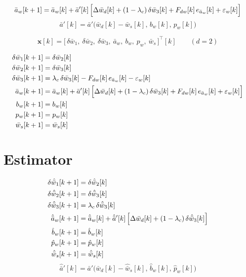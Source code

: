 \documentclass[11pt,a4paper,fontset=none]{ctexart}
\begin{document}
\begin{align*}
\bar{a}_w[k+1] = \bar{a}_w[k] + \bar{a}'[k]\,\Bigl[
  \Delta\bar{w}_d[k] + (1-\lambda_c)\,\delta\bar{w}_3[k]
  + F_{dw}[k]\,e_{\bar{a}_w}[k] + \varepsilon_w[k] \Bigr]
\end{align*}
\begin{equation*}
\bar{a}'[k] = \bar{a}'\bigl(\bar{w}_d[k]-\bar{w}_s[k],\, b_w[k],\, p_w[k]\bigr)
\end{equation*}

\begin{equation*}
\mathbf{x}[k] = \bigl[\,\delta\bar{w}_1,\ \delta\bar{w}_2,\ \delta\bar{w}_3,\
\bar{a}_w,\ b_w,\ p_w,\ \bar{w}_s\,\bigr]^{\top}[k] \qquad (d = 2)
\end{equation*}

\begin{align*}
\delta\bar{w}_1[k+1] &= \delta\bar{w}_2[k] \\
\delta\bar{w}_2[k+1] &= \delta\bar{w}_3[k] \\
\delta\bar{w}_3[k+1] &= \lambda_c\,\delta\bar{w}_3[k]
  - F_{dw}[k]\,e_{\bar{a}_w}[k] - \varepsilon_w[k] \\
\bar{a}_w[k+1] &= \bar{a}_w[k] + \bar{a}'[k]\,\Bigl[
  \Delta\bar{w}_d[k] + (1-\lambda_c)\,\delta\bar{w}_3[k]
  + F_{dw}[k]\,e_{\bar{a}_w}[k] + \varepsilon_w[k] \Bigr] \\
b_w[k+1] &= b_w[k] \\
p_w[k+1] &= p_w[k] \\
\bar{w}_s[k+1] &= \bar{w}_s[k]
\end{align*}

\section{Estimator}

\begin{align*}
\delta\hat{\bar{w}}_1[k+1] &= \delta\hat{\bar{w}}_2[k] \\
\delta\hat{\bar{w}}_2[k+1] &= \delta\hat{\bar{w}}_3[k] \\
\delta\hat{\bar{w}}_3[k+1] &= \lambda_c\,\delta\hat{\bar{w}}_3[k] \\
\hat{\bar{a}}_w[k+1] &= \hat{\bar{a}}_w[k] + \hat{\bar{a}}'[k]\,\Bigl[
  \Delta\bar{w}_d[k] + (1-\lambda_c)\,\delta\hat{\bar{w}}_3[k] \Bigr] \\
\hat{b}_w[k+1] &= \hat{b}_w[k] \\
\hat{p}_w[k+1] &= \hat{p}_w[k] \\
\hat{\bar{w}}_s[k+1] &= \hat{\bar{w}}_s[k]
\end{align*}
\begin{equation*}
\hat{\bar{a}}'[k] = \bar{a}'\bigl(\bar{w}_d[k]-\hat{\bar{w}}_s[k],\,
\hat{b}_w[k],\, \hat{p}_w[k]\bigr)
\end{equation*}
\end{document}
